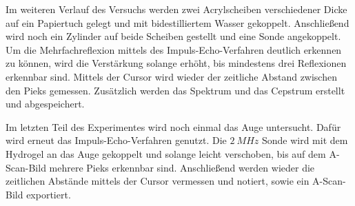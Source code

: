 Im weiteren Verlauf des Versuchs werden zwei Acrylscheiben verschiedener Dicke
auf ein Papiertuch gelegt und mit bidestilliertem Wasser gekoppelt. Anschließend
wird noch ein Zylinder auf beide Scheiben gestellt und eine Sonde angekoppelt.
Um die Mehrfachreflexion mittels des Impuls-Echo-Verfahren deutlich erkennen zu
können, wird die Verstärkung
solange erhöht, bis mindestens drei Reflexionen erkennbar sind. Mittels der Cursor
wird wieder der zeitliche Abstand zwischen den Pieks gemessen. Zusätzlich werden
das Spektrum und das Cepstrum erstellt und abgespeichert.

Im letzten Teil des Experimentes wird noch einmal das Auge untersucht. Dafür wird
erneut das Impuls-Echo-Verfahren genutzt. Die $\SI{2}{MHz}$ Sonde wird mit dem
Hydrogel an das Auge gekoppelt und solange leicht verschoben, bis auf dem A-Scan-Bild
mehrere Pieks erkennbar sind. Anschließend werden wieder die zeitlichen Abstände
mittels der Cursor vermessen und notiert, sowie ein A-Scan-Bild exportiert.
